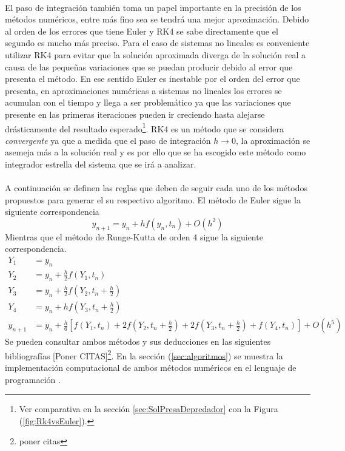 \\%
El paso de integración también toma un papel importante en la precisión de los métodos numéricos, entre más fino sea se tendrá una mejor aproximación. Debido al orden de los errores que tiene Euler y RK4 se sabe directamente que el segundo es mucho más preciso. Para el caso de sistemas no lineales es conveniente utilizar RK4 para evitar que la solución aproximada diverga de la solución real a causa de las pequeñas variaciones que se puedan producir debido al error que presenta el método. En ese sentido Euler es inestable por el orden del error que presenta, en aproximaciones numéricas a sistemas no lineales los errores se acumulan con el tiempo y llega a ser problemático ya que las variaciones que presente en las primeras iteraciones pueden ir creciendo hasta alejarse drásticamente del resultado esperado\footnote{Ver comparativa en la sección \ref{sec:SolPresaDepredador} con la Figura (\ref{fig:Rk4vsEuler}).}. RK4 es un método que se considera \textit{convergente} ya que a medida que el paso de integración $h\to 0$, la aproximación se asemeja más a la solución real y es por ello que se ha escogido este método como integrador estrella del sistema que se irá a analizar.\\
\\
A continuación se definen las reglas que deben de seguir cada uno de los métodos propuestos para generar el su respectivo algoritmo. El método de Euler sigue la siguiente correspondencia
\begin{equation}\label{eqn:Euler}
	y_{n+1}=y_n+hf(y_n,t_n)+O(h^2)
\end{equation}
Mientras que el método de Runge-Kutta de orden 4 sigue la siguiente correspondencia.
\begin{equation}\label{eqn:RK4}
	\begin{split}
		Y_1 &= y_n\\
		Y_2 &= y_n+\frac{h}{2}f(Y_1,t_n)\\
		Y_3 &= y_n+\frac{h}{2}f\left (Y_2,t_n+\frac{h}{2}\right )\\
		Y_4 &= y_n+hf\left (Y_3,t_n+\frac{h}{2}\right )\\
		y_{n+1} &= y_n+\frac{h}{6}\left [f(Y_1,t_n)+2f\left (Y_2,t_n+\frac{h}{2}\right)+ 2f\left (Y_3,t_n+\frac{h}{2}\right )+f(Y_4,t_n)\right ]+O(h^5)
	\end{split}
\end{equation}
Se pueden consultar ambos métodos y sus deducciones en las siguientes bibliografías [Poner CITAS]\footnote{poner citas}. En la sección (\ref{sec:algoritmos}) se muestra la implementación computacional de ambos métodos numéricos en el lenguaje de programación \julia.
